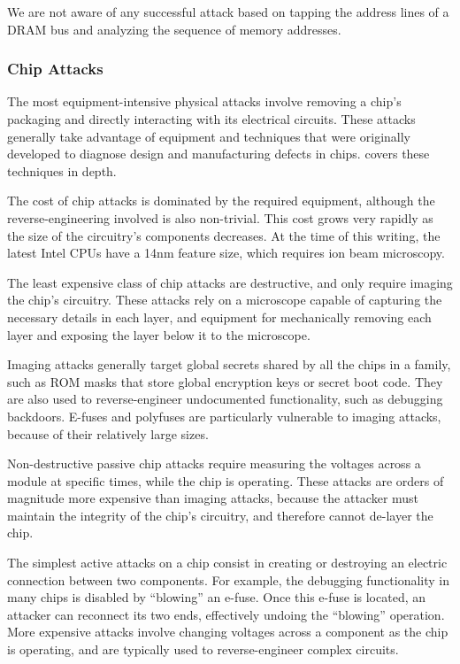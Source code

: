 We are not aware of any successful attack based on tapping the address lines of
a DRAM bus and analyzing the sequence of memory addresses.


\subsubsection{Chip Attacks}
\label{sec:physical_chip_attacks}

The most equipment-intensive physical attacks involve removing a chip's
packaging and directly interacting with its electrical circuits. These attacks
generally take advantage of equipment and techniques that were originally
developed to diagnose design and manufacturing defects in chips.
\cite{beck1998integrated} covers these techniques in depth.

The cost of chip attacks is dominated by the required equipment, although the
reverse-engineering involved is also non-trivial. This cost grows very rapidly
as the size of the circuitry's components decreases. At the time of this
writing, the latest Intel CPUs have a 14nm feature size, which requires ion
beam microscopy. %

The least expensive class of chip attacks are destructive, and only require
imaging the chip's circuitry. These attacks rely on a microscope capable of
capturing the necessary details in each layer, and equipment for mechanically
removing each layer and exposing the layer below it to the microscope.

Imaging attacks generally target global secrets shared by all the chips in a
family, such as ROM masks that store global encryption keys or secret boot
code. They are also used to reverse-engineer undocumented functionality, such
as debugging backdoors. E-fuses and polyfuses are particularly vulnerable to
imaging attacks, because of their relatively large sizes.

Non-destructive passive chip attacks require measuring the voltages across a
module at specific times, while the chip is operating. These attacks are orders
of magnitude more expensive than imaging attacks, because the attacker must
maintain the integrity of the chip's circuitry, and therefore cannot de-layer
the chip.

The simplest active attacks on a chip consist in creating or destroying an
electric connection between two components. For example, the debugging
functionality in many chips is disabled by ``blowing'' an e-fuse. Once this
e-fuse is located, an attacker can reconnect its two ends, effectively undoing
the ``blowing'' operation. More expensive attacks involve changing voltages
across a component as the chip is operating, and are typically used to
reverse-engineer complex circuits.

